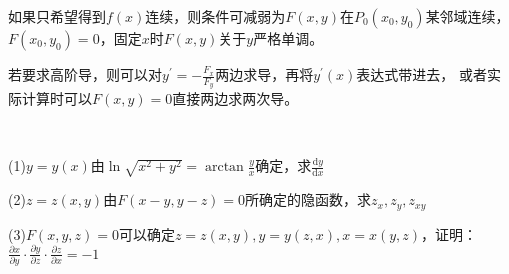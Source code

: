 \begin{note}
  如果只希望得到$f(x)$连续，则条件可减弱为$F(x,y)$在$P_0(x_0,y_0)$某邻域连续，
  $F(x_0,y_0) = 0$，固定$x$时$F(x,y)$关于$y$严格单调。
\end{note}

\begin{note}
  若要求高阶导，则可以对$y^{\prime} = - \frac{F_x}{F_y}$两边求导，再将$y^{\prime}(x)$表达式带进去，
  或者实际计算时可以$F(x,y) = 0$直接两边求两次导。
\end{note}

~

\begin{exercise}[隐函数求导]
  (1)$y = y(x)$由$\ln \sqrt{x^2 + y^2} = \arctan \frac{y}{x}$确定，求$\frac{\mathrm{d} y}{\mathrm{d} x}$

  (2)$z = z(x,y)$由$F(x-y,y-z) = 0$所确定的隐函数，求$z_x,z_y,z_{xy}$

  (3)$F(x,y,z) = 0$可以确定$z = z(x,y), y = y(z,x), x = x(y,z)$，证明：$\frac{\partial x}{\partial y} \cdot \frac{\partial y}{\partial z} \cdot \frac{\partial z}{\partial x} = -1$
\end{exercise}

